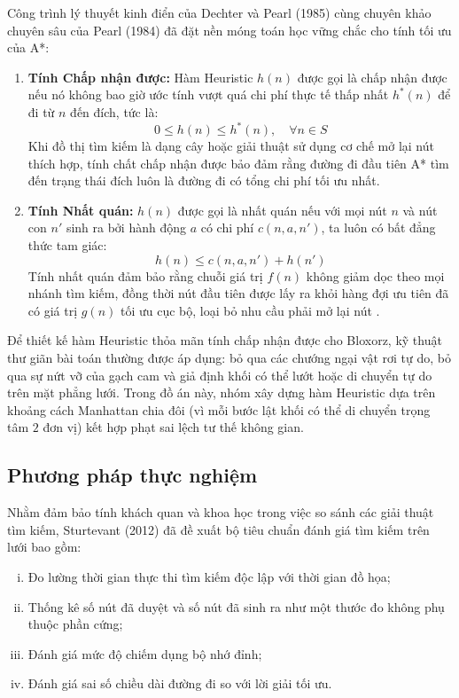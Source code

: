 Công trình lý thuyết kinh điển của Dechter và Pearl (1985)
\cite{dechter1985astar} cùng chuyên khảo chuyên sâu của Pearl (1984)
\cite{pearl1984heuristics} đã đặt nền móng toán học vững chắc cho tính
tối ưu của A*:
\begin{enumerate}[1.]
    \item \textbf{Tính Chấp nhận được:}
    Hàm Heuristic $h(n)$ được gọi là chấp nhận được nếu nó không bao giờ
    ước tính vượt quá chi phí thực tế thấp nhất $h^*(n)$ để đi từ $n$ đến
    đích, tức là:
    \begin{equation}
        0 \le h(n) \le h^*(n), \quad \forall n \in S
        \label{eq:admissibility}
    \end{equation}
    Khi đồ thị tìm kiếm là dạng cây hoặc giải thuật sử dụng cơ chế mở lại
    nút thích hợp, tính chất chấp nhận được bảo đảm rằng đường đi đầu tiên
    A* tìm đến trạng thái đích luôn là đường đi có tổng chi phí tối ưu
    nhất.

    \item \textbf{Tính Nhất quán:}
    $h(n)$ được gọi là nhất quán nếu với mọi nút $n$ và nút con $n'$ sinh
    ra bởi hành động $a$ có chi phí $c(n, a, n')$, ta luôn có bất đẳng thức
    tam giác:
    \begin{equation}
        h(n) \le c(n, a, n') + h(n')
        \label{eq:consistency}
    \end{equation}
    Tính nhất quán đảm bảo rằng chuỗi giá trị $f(n)$ không giảm dọc theo
    mọi nhánh tìm kiếm, đồng thời nút đầu tiên được lấy ra khỏi hàng đợi
    ưu tiên đã có giá trị $g(n)$ tối ưu cục bộ, loại bỏ nhu cầu phải mở
    lại nút \cite{edelkamp2011heuristic}.
\end{enumerate}

Để thiết kế hàm Heuristic thỏa mãn tính chấp nhận được cho Bloxorz, kỹ thuật
thư giãn bài toán \cite{pearl1984heuristics} thường được áp dụng: bỏ qua các
chướng ngại vật rơi tự do, bỏ qua sự nứt vỡ của gạch cam và giả định khối
có thể lướt hoặc di chuyển tự do trên mặt phẳng lưới. Trong đồ án này, nhóm
xây dựng hàm Heuristic dựa trên khoảng cách Manhattan chia đôi (vì mỗi bước
lật khối có thể di chuyển trọng tâm $2$ đơn vị) kết hợp phạt sai lệch tư thế
không gian.

\subsection{Phương pháp thực nghiệm}
\label{subsec:related_benchmarks}
Nhằm đảm bảo tính khách quan và khoa học trong việc so sánh các giải
thuật tìm kiếm, Sturtevant (2012) \cite{sturtevant2012benchmarks} đã đề
xuất bộ tiêu chuẩn đánh giá tìm kiếm trên lưới bao gồm:
\begin{enumerate}[(i)]
    \item Đo lường thời gian thực thi tìm kiếm độc lập với thời gian đồ họa;
    \item Thống kê số nút đã duyệt và số nút đã sinh ra như một thước đo không
    phụ thuộc phần cứng;
    \item Đánh giá mức độ chiếm dụng bộ nhớ đỉnh;
    \item Đánh giá sai số chiều dài đường đi so với lời giải tối ưu.
\end{enumerate}

